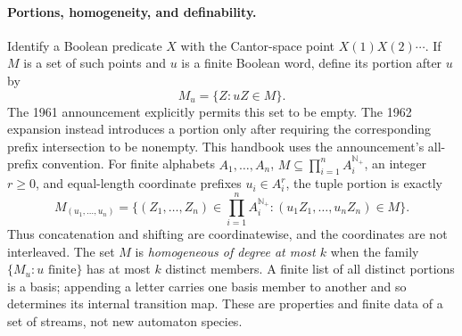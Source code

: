 \paragraph{Portions, homogeneity, and definability.}
Identify a Boolean predicate \(X\) with the Cantor-space point
\(X(1)X(2)\cdots\).  If \(M\) is a set of such points and \(u\) is a finite
Boolean word, define its portion after \(u\) by
\[
  M_u=\{Z:uZ\in M\}.
\]
The 1961 announcement explicitly permits this set to be empty.  The 1962
expansion instead introduces a portion only after requiring the corresponding
prefix intersection to be nonempty.  This handbook uses the announcement's
all-prefix convention.  For finite alphabets \(A_1,\ldots,A_n\),
\(M\subseteq\prod_{i=1}^n A_i^{\mathbb N_{+}}\), an integer \(r\geq0\), and
equal-length coordinate prefixes \(u_i\in A_i^r\), the tuple portion is exactly
\[
 M_{(u_1,\ldots,u_n)}
 =\bigl\{(Z_1,\ldots,Z_n)\in\prod_{i=1}^n A_i^{\mathbb N_{+}}:
        (u_1Z_1,\ldots,u_nZ_n)\in M\bigr\}.
\]
Thus concatenation and shifting are coordinatewise, and the coordinates are
not interleaved.  The set \(M\) is \emph{homogeneous of degree at most \(k\)}
when the family \(\{M_u:u\text{ finite}\}\) has at most \(k\) distinct
members.  A finite list of all distinct portions is a basis; appending a
letter carries one basis member to another and so determines its internal
transition map.  These are properties and finite data of a set of streams,
not new automaton species.

